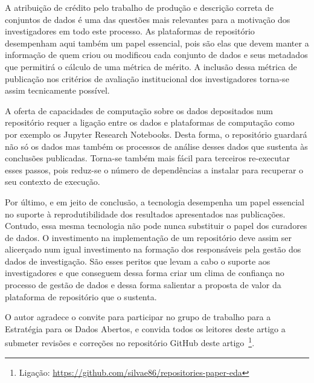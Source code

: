 \documentclass[sigconf,nonacm]{acmart}
\begin{document}
A atribuição de crédito pelo trabalho de produção e descrição correta de conjuntos de dados é uma das questões mais relevantes para a motivação dos investigadores em todo este processo. As plataformas de repositório desempenham aqui também um papel essencial, pois são elas que devem manter a informação de quem criou ou modificou cada conjunto de dados e seus metadados que permitirá o cálculo de uma métrica de mérito. A inclusão dessa métrica de publicação nos critérios de avaliação institucional dos investigadores torna-se assim tecnicamente possível.

A oferta de capacidades de computação sobre os dados depositados num repositório requer a ligação entre os dados e plataformas de computação como por exemplo os Jupyter Research Notebooks. Desta forma, o repositório guardará não só os dados mas também os processos de análise desses dados que sustenta às conclusões publicadas. Torna-se também mais fácil para terceiros re-executar esses passos, pois reduz-se o número de dependências a instalar para recuperar o seu contexto de execução.

Por último, e em jeito de conclusão, a tecnologia desempenha um papel essencial no suporte à reprodutibilidade dos resultados apresentados nas publicações. Contudo, essa mesma tecnologia não pode nunca substituir o papel dos curadores de dados. O investimento na implementação de um repositório deve assim ser alicerçado num igual investimento na formação dos responsáveis pela gestão dos dados de investigação. São esses peritos que levam a cabo o suporte aos investigadores e que conseguem dessa forma criar um clima de confiança no processo de gestão de dados e dessa forma salientar a proposta de valor da plataforma de repositório que o sustenta.


\begin{acks}
O autor agradece o convite para participar no grupo de trabalho para a Estratégia para os Dados Abertos, e convida todos os leitores deste artigo a submeter revisões e correções no repositório GitHub deste artigo~\footnote{Ligação: \url{https://github.com/silvae86/repositories-paper-eda}}.
\end{acks}




\end{document}
